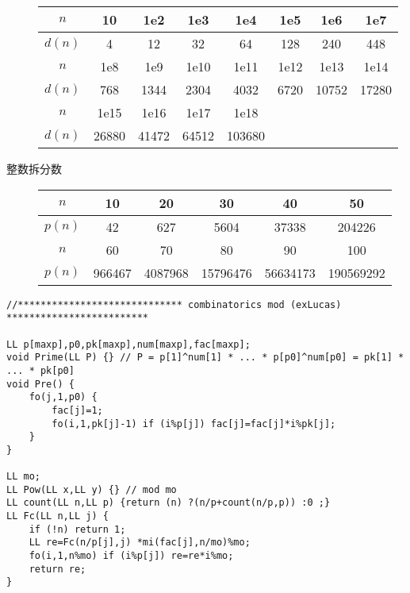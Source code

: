 \documentclass[6pt]{article}
\begin{document}
\begin{multicols}{2}
\begin{description}
          \begin{tabular}{@{}|c|ccccccc|}
            \hline
            $n$    & 10    & 1e2   & 1e3   & 1e4    & 1e5  & 1e6   & 1e7   \\
            \hline
            $d(n)$ & 4     & 12    & 32    & 64     & 128  & 240   & 448   \\
            \hline
            $n$    & 1e8   & 1e9   & 1e10  & 1e11   & 1e12 & 1e13  & 1e14  \\
            \hline
            $d(n)$ & 768   & 1344  & 2304  & 4032   & 6720 & 10752 & 17280 \\
            \hline
            $n$    & 1e15  & 1e16  & 1e17  & 1e18   &      &       &       \\
            \hline
            $d(n)$ & 26880 & 41472 & 64512 & 103680 &      &       &       \\
            \hline
          \end{tabular}
    \item[整数拆分数]

          \begin{tabular}{@{}|c|ccccc|}
            \hline
            $n$    & 10     & 20      & 30       & 40       & 50        \\
            \hline
            $p(n)$ & 42     & 627     & 5604     & 37338    & 204226    \\
            \hline
            $n$    & 60     & 70      & 80       & 90       & 100       \\
            \hline
            $p(n)$ & 966467 & 4087968 & 15796476 & 56634173 & 190569292 \\
            \hline
          \end{tabular}
  \end{description}

  \begin{lstlisting}
//***************************** combinatorics mod (exLucas) *************************

LL p[maxp],p0,pk[maxp],num[maxp],fac[maxp];
void Prime(LL P) {} // P = p[1]^num[1] * ... * p[p0]^num[p0] = pk[1] * ... * pk[p0]
void Pre() {
    fo(j,1,p0) {
        fac[j]=1;
        fo(i,1,pk[j]-1) if (i%p[j]) fac[j]=fac[j]*i%pk[j];
    }
}

LL mo;
LL Pow(LL x,LL y) {} // mod mo
LL count(LL n,LL p) {return (n) ?(n/p+count(n/p,p)) :0 ;}
LL Fc(LL n,LL j) {
    if (!n) return 1;
    LL re=Fc(n/p[j],j) *mi(fac[j],n/mo)%mo;
    fo(i,1,n%mo) if (i%p[j]) re=re*i%mo;
    return re;
}


\end{lstlisting}
\end{multicols}
\end{document}
